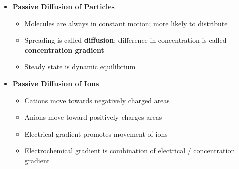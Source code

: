 \documentclass[11pt]{article}
\begin{document}
\begin{itemize}
\item \textbf{Passive Diffusion of Particles}
\begin{itemize}
\item Molecules are always in constant motion; more likely to distribute
\item Spreading is called \textbf{diffusion}; difference in concentration is called \textbf{concentration gradient}
\item Steady state is dynamic equilibrium
\end{itemize}

\item \textbf{Passive Diffusion of Ions}
\begin{itemize}
\item Cations move towards negatively charged areas
\item Anions move toward positively charges areas
\item Electrical gradient promotes movement of ions 
\item Electrochemical gradient is combination of electrical / concentration gradient
\end{itemize}


\end{itemize}
\end{document}
